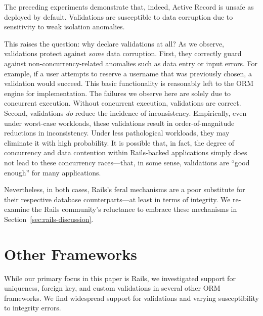 The preceding experiments demonstrate that, indeed, Active Record is
unsafe as deployed by default. Validations are susceptible to data
corruption due to sensitivity to weak isolation anomalies.

This raises the question: why declare validations at all? As we
observe, validations protect against \textit{some} data
corruption. First, they correctly guard against
non-concurrency-related anomalies such as data entry or input
errors. For example, if a user attempts to reserve a username that was
previously chosen, a validation would succeed. This basic
functionality is reasonably left to the ORM engine for
implementation. The failures we observe here are solely due to
concurrent execution. Without concurrent execution, validations are
correct. Second, validations \textit{do} reduce the incidence of
inconsistency. Empirically, even under worst-case workloads, these
validations result in order-of-magnitude reductions in
inconsistency. Under less pathological workloads, they may eliminate
it with high probability. It is possible that, in fact, the degree of
concurrency and data contention within Rails-backed applications
simply does not lead to these concurrency races---that, in some sense,
validations are ``good enough'' for many applications.

Nevertheless, in both cases, Rails's feral mechanisms are a poor
substitute for their respective database counterparts---at least in
terms of integrity. We re-examine the Rails community's reluctance to
embrace these mechanisms in Section~\ref{sec:rails-discussion}.




\section{Other Frameworks}
\label{sec:other-orms}

While our primary focus in this paper is Rails, we investigated
support for uniqueness, foreign key, and custom validations in several
other ORM frameworks. We find widespread support for validations and
varying susceptibility to integrity errors.

\newcommand{\orm}[1]{{\vspace{.45em}\noindent\textit{#1}}}

